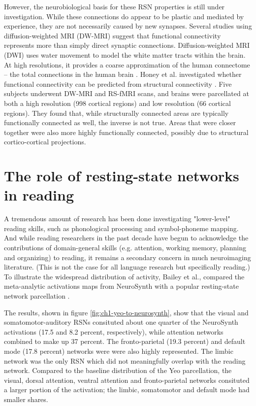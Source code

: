 However, the neurobiological basis for these RSN properties is still under investigation. While these connections do appear to be plastic and mediated by experience, they are not necessarily caused by new synapses. Several studies using diffusion-weighted MRI (DW-MRI) suggest that functional connectivity represents more than simply direct synaptic connections. Diffusion-weighted MRI (DWI) uses water movement to model the white matter tracts within the brain. At high resolutions, it provides a coarse approximation of the human connectome -- the total connections in the human brain \citep{Sporns2005}. Honey et al. investigated whether functional connectivity can be predicted from structural connectivity \citep{Honey2009}. Five subjects underwent DW-MRI and RS-fMRI scans, and brains were parcellated at both a high resolution (998 cortical regions) and low resolution (66 cortical regions). They found that, while structurally connected areas are typically functionally connected as well, the inverse is not true. Areas that were closer together were also more highly functionally connected, possibly due to structural cortico-cortical projections. 

\section{The role of resting-state networks in reading}
A tremendous amount of research has been done investigating "lower-level" reading skills, such as phonological processing and symbol-phoneme mapping. And while reading researchers in the past decade have begun to acknowledge the contributions of domain-general skills (e.g. attention, working memory, planning and organizing) to reading, it remains a secondary concern in much neuroimaging literature. (This is not the case for all language research but specifically reading.) To illustrate the widespread distribution of activity, Bailey et al., compared the meta-analytic activations maps from NeuroSynth with a popular resting-state network parcellation \citep{Bailey2018}. 

The results, shown in figure \ref{fig:ch1-yeo-to-neurosynth}, show that the visual and somatomotor-auditory RSNs consituted about one quarter of the NeuroSynth activations (17.5 and 8.2 percent, respectively), while attention networks combined to make up 37 percent. The fronto-parietal (19.3 percent) and default mode (17.8 percent) networks were were also highly represented. The limbic network was the only RSN which did not meaningfully overlap with the reading network. Compared to the baseline distribution of the Yeo parcellation, the visual, dorsal attention, ventral attention and fronto-parietal networks consituted a larger portion of the activation; the limbic, somatomotor and default mode had smaller shares. 

